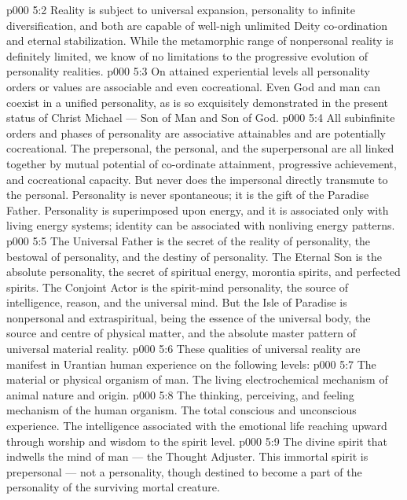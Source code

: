 \vs p000 5:2 Reality is subject to universal expansion, personality to infinite diversification, and both are capable of well\hyp{}nigh unlimited Deity co\hyp{}ordination and eternal stabilization. While the metamorphic range of nonpersonal reality is definitely limited, we know of no limitations to the progressive evolution of personality realities.
\vs p000 5:3 On attained experiential levels all personality orders or values are associable and even cocreational. Even God and man can coexist in a unified personality, as is so exquisitely demonstrated in the present status of Christ Michael --- Son of Man and Son of God.
\vs p000 5:4 All subinfinite orders and phases of personality are associative attainables and are potentially cocreational. The prepersonal, the personal, and the superpersonal are all linked together by mutual potential of co\hyp{}ordinate attainment, progressive achievement, and cocreational capacity. But never does the impersonal directly transmute to the personal. Personality is never spontaneous; it is the gift of the Paradise Father. Personality is superimposed upon energy, and it is associated only with living energy systems; identity can be associated with nonliving energy patterns.
\vs p000 5:5 \pc The Universal Father is the secret of the reality of personality, the bestowal of personality, and the destiny of personality. The Eternal Son is the absolute personality, the secret of spiritual energy, morontia spirits, and perfected spirits. The Conjoint Actor is the spirit\hyp{}mind personality, the source of intelligence, reason, and the universal mind. But the Isle of Paradise is nonpersonal and extraspiritual, being the essence of the universal body, the source and centre of physical matter, and the absolute master pattern of universal material reality.
\vs p000 5:6 \pc These qualities of universal reality are manifest in Urantian human experience on the following levels:
\vs p000 5:7 \bibnobreakspace {} The material or physical organism of man. The living electrochemical mechanism of animal nature and origin.
\vs p000 5:8 \bibnobreakspace {} The thinking, perceiving, and feeling mechanism of the human organism. The total conscious and unconscious experience. The intelligence associated with the emotional life reaching upward through worship and wisdom to the spirit level.
\vs p000 5:9 \bibnobreakspace {} The divine spirit that indwells the mind of man --- the Thought Adjuster. This immortal spirit is prepersonal --- not a personality, though destined to become a part of the personality of the surviving mortal creature.
